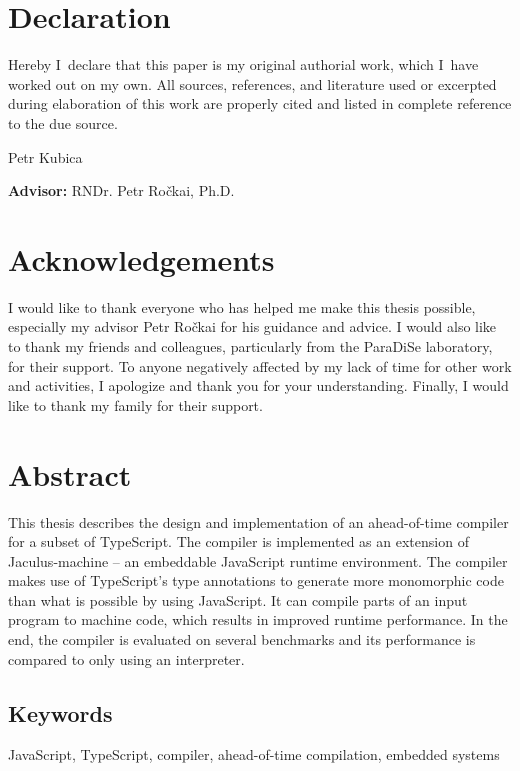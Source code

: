 \section*{Declaration} Hereby I~declare that this paper is my original authorial work, which
I~have worked out on my own. All sources, references, and literature
used or excerpted during elaboration of this work are properly cited
and listed in complete reference to the due source.

\vspace{1cm}
\begin{flushright}
Petr Kubica
\end{flushright}

\vfill\noindent
\textbf{Advisor:} RNDr. Petr Ročkai, Ph.D.   %
\cleardoublepage

\section*{Acknowledgements} %
I would like to thank everyone who has helped me make this thesis possible, especially my advisor Petr Ročkai for his guidance and advice. I would also like to thank my friends and colleagues, particularly from the ParaDiSe laboratory, for their support. To anyone negatively affected by my lack of time for other work and activities, I apologize and thank you for your understanding. Finally, I would like to thank my family for their support.
\cleardoublepage

\section*{Abstract} %
This thesis describes the design and implementation of an ahead-of-time compiler for a subset of TypeScript. The compiler is implemented as an extension of Jaculus-machine -- an embeddable JavaScript runtime environment. The compiler makes use of TypeScript's type annotations to generate more monomorphic code than what is possible by using JavaScript. It can compile parts of an input program to machine code, which results in improved runtime performance. In the end, the compiler is evaluated on several benchmarks and its performance is compared to only using an interpreter.

\subsection*{Keywords} %
JavaScript, TypeScript, compiler, ahead-of-time compilation, embedded systems
\cleardoublepage
